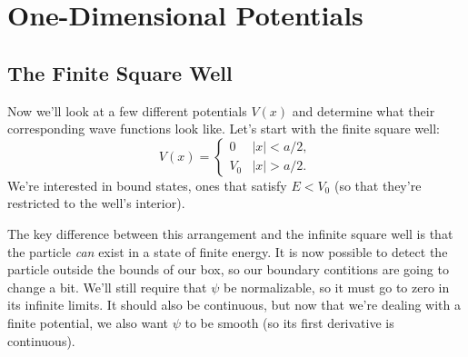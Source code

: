 \documentclass[../p052main.tex]{subfiles}
\begin{document}
\chapter{One-Dimensional Potentials}
\section{The Finite Square Well}
Now we'll look at a few different potentials $V(x)$ and determine what their corresponding wave functions look like.
Let's start with the finite square well:
\[ V(x) = \begin{cases} 0 & |x| < a/2, \\ V_0 & |x| > a/2. \end{cases} \]
We're interested in bound states, ones that satisfy $E < V_0$ (so that they're restricted to the well's interior).

The key difference between this arrangement and the infinite square well is that the particle \textit{can} exist in a state of finite energy.
It is now possible to detect the particle outside the bounds of our box, so our boundary contitions are going to change a bit.
We'll still require that $\psi$ be normalizable, so it must go to zero in its infinite limits.
It should also be continuous, but now that we're dealing with a finite potential, we also want $\psi$ to be smooth (so its first derivative is continuous).
\end{document}

